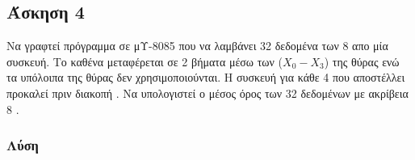 \newpage \subsection*{Άσκηση 4}

Να γραφτεί πρόγραμμα  σε μΥ-8085 που να λαμβάνει 32 δεδομένα των 8  απο μία συσκευή.
Το καθένα μεταφέρεται σε 2 βήματα μέσω των ($ X_0-X_3 $) της θύρας  ενώ τα υπόλοιπα  της
θύρας δεν χρησιμοποιούνται. Η συσκευή για κάθε 4  που αποστέλλει προκαλεί πριν διακοπή . 
Να υπολογιστεί ο μέσος όρος των 32 δεδομένων με ακρίβεια 8 .


\subsubsection*{Λύση}

\inputminted{text}{./exercise4/exercise.8085}


